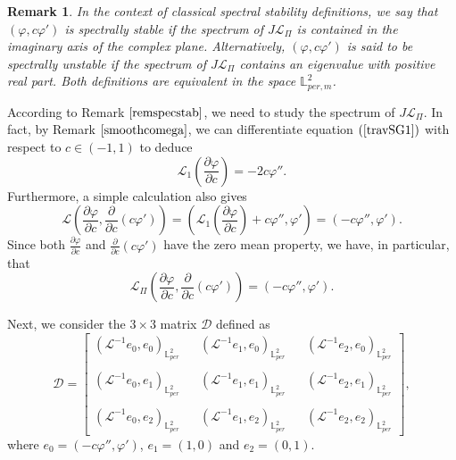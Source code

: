 \documentclass[12pt,reqno,a4paper]{amsart} %
\numberwithin{equation}{section}
\numberwithin{figure}{section}
\newtheorem{remark}[theorem]{Remark}
\begin{document}
 \begin{remark}\label{remspecstab}
 	In the context of classical spectral stability definitions, we say that $(\varphi, c\varphi')$ is spectrally stable if the spectrum of $J\mathcal{L}_{\Pi}$ is contained in the imaginary axis of the complex plane. Alternatively, $(\varphi,c\varphi')$ is said to be spectrally unstable if the spectrum of $J\mathcal{L}_{\Pi}$ contains an eigenvalue with positive real part. Both definitions are equivalent in the space $\mathbb{L}_{per,m}^2$.
 \end{remark}
 
  
According to Remark $\ref{remspecstab}$, we need to study the spectrum of $J\mathcal{L}_{\Pi}$. In fact, by Remark $\ref{smoothcomega}$, we can differentiate equation $(\ref{travSG1})$ with respect to $c\in(-1,1)$ to deduce
 \begin{equation}\label{L1c}
 	\mathcal{L}_1\left(\frac{\partial\varphi}{\partial c}\right)=-2c\varphi''.
 \end{equation}   Furthermore, a simple calculation also gives
 \begin{equation}\label{calcL1}
 	\mathcal{L}\left(\frac{\partial\varphi}{\partial c},\frac{\partial}{\partial c}(c\varphi')\right)=\left(\mathcal{L}_1 \left(\frac{\partial\varphi}{\partial c}\right)+c\varphi'', \varphi '\right)
 	=(-c\varphi'',\varphi'). %
 \end{equation} Since both  $\frac{\partial\varphi}{\partial c}$ and $\frac{\partial}{\partial c}(c\varphi')$ have the zero mean property, we have, in particular, that
 \begin{equation}\label{calcL2}
 	\mathcal{L}_{\Pi}\left(\frac{\partial\varphi}{\partial c},\frac{\partial}{\partial c}(c\varphi ')\right)
 	=(-c\varphi'',\varphi'). %
 \end{equation}
 
 Next, we consider the $3\times 3$ matrix $\mathcal{D}$ defined as 
 \begin{equation}\label{matrixD'} 
 	\mathcal{D}=\left[\begin{array}{llllll}(\mathcal{L}^{-1}e_0,e_0)_{\mathbb{L}^2_{per}}& & (\mathcal{L}^{-1}e_1,e_0)_{\mathbb{L}^2_{per}}& & (\mathcal{L}^{-1}e_2,e_0)_{\mathbb{L}^2_{per}}\\\\
 		(\mathcal{L}^{-1}e_0,e_1)_{\mathbb{L}^2_{per}}& & (\mathcal{L}^{-1}e_1,e_1)_{\mathbb{L}^2_{per}}& & (\mathcal{L}^{-1}e_2,e_1)_{\mathbb{L}^2_{per}}\\\\
 		(\mathcal{L}^{-1}e_0,e_2)_{\mathbb{L}^2_{per}}& & (\mathcal{L}^{-1}e_1,e_2)_{\mathbb{L}^2_{per}}& & (\mathcal{L}^{-1}e_2,e_2)_{\mathbb{L}^2_{per}}\end{array}\right],
 \end{equation}where $e_0=(-c\varphi '', \varphi')$, $e_1=(1,0)$ and $e_2=(0,1)$.
 
\end{document}
